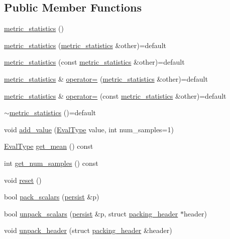 \subsection*{Public Member Functions}
\begin{DoxyCompactItemize}
\item 
\hyperlink{structlbann_1_1metric__statistics_ab1d7b4cee7135230e0b3c6f56a579879}{metric\+\_\+statistics} ()
\item 
\hyperlink{structlbann_1_1metric__statistics_a03e015279805c8f6b532ea9daa5edfdb}{metric\+\_\+statistics} (\hyperlink{structlbann_1_1metric__statistics}{metric\+\_\+statistics} \&other)=default
\item 
\hyperlink{structlbann_1_1metric__statistics_a4575aafb156f2d76a5bb29d7db1765c4}{metric\+\_\+statistics} (const \hyperlink{structlbann_1_1metric__statistics}{metric\+\_\+statistics} \&other)=default
\item 
\hyperlink{structlbann_1_1metric__statistics}{metric\+\_\+statistics} \& \hyperlink{structlbann_1_1metric__statistics_a4d9ae608667c58eda58be3f4a237122d}{operator=} (\hyperlink{structlbann_1_1metric__statistics}{metric\+\_\+statistics} \&other)=default
\item 
\hyperlink{structlbann_1_1metric__statistics}{metric\+\_\+statistics} \& \hyperlink{structlbann_1_1metric__statistics_abdd86ced3ca40a411ebc1db2b857653b}{operator=} (const \hyperlink{structlbann_1_1metric__statistics}{metric\+\_\+statistics} \&other)=default
\item 
\hyperlink{structlbann_1_1metric__statistics_aa25840fdf7ef1ea78523047cb904d2c3}{$\sim$metric\+\_\+statistics} ()=default
\item 
void \hyperlink{structlbann_1_1metric__statistics_a1933a2417f08d99b1ddfa2b883dae68a}{add\+\_\+value} (\hyperlink{base_8hpp_a3266f5ac18504bbadea983c109566867}{Eval\+Type} value, int num\+\_\+samples=1)
\item 
\hyperlink{base_8hpp_a3266f5ac18504bbadea983c109566867}{Eval\+Type} \hyperlink{structlbann_1_1metric__statistics_ac3cb1abfc32b090fa2a08bda6afa5c09}{get\+\_\+mean} () const
\item 
int \hyperlink{structlbann_1_1metric__statistics_a24e7c8d8ecc2a02279d73b908fc97133}{get\+\_\+num\+\_\+samples} () const
\item 
void \hyperlink{structlbann_1_1metric__statistics_a3ab2a4cd36c154e495bc8f18c4295907}{reset} ()
\item 
bool \hyperlink{structlbann_1_1metric__statistics_a88f5324c96cceb47d723d2acfddb41f1}{pack\+\_\+scalars} (\hyperlink{classlbann_1_1persist}{persist} \&p)
\item 
bool \hyperlink{structlbann_1_1metric__statistics_a4ff472c5d9155fe28c5a576c49f1e154}{unpack\+\_\+scalars} (\hyperlink{classlbann_1_1persist}{persist} \&p, struct \hyperlink{structlbann_1_1metric__statistics_1_1packing__header}{packing\+\_\+header} $\ast$header)
\item 
void \hyperlink{structlbann_1_1metric__statistics_acdc0ca1af87e9cbd615c6e77b9dba21c}{unpack\+\_\+header} (struct \hyperlink{structlbann_1_1metric__statistics_1_1packing__header}{packing\+\_\+header} \&header)
\end{DoxyCompactItemize}
